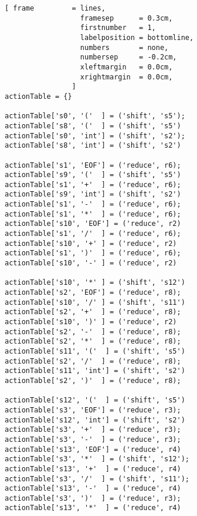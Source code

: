 \begin{figure}[!ht]
\centering
\begin{Verbatim}[ frame         = lines, 
                  framesep      = 0.3cm, 
                  firstnumber   = 1,
                  labelposition = bottomline,
                  numbers       = none,
                  numbersep     = -0.2cm,
                  xleftmargin   = 0.0cm,
                  xrightmargin  = 0.0cm,
                ]
actionTable = {}

actionTable['s0', '('  ] = ('shift', 's5');  actionTable['s8', '('  ] = ('shift', 's5')   
actionTable['s0', 'int'] = ('shift', 's2');  actionTable['s8', 'int'] = ('shift', 's2')   
                                                                                         
actionTable['s1', 'EOF'] = ('reduce', r6);   actionTable['s9', '('  ] = ('shift', 's5')   
actionTable['s1', '+'  ] = ('reduce', r6);   actionTable['s9', 'int'] = ('shift', 's2')   
actionTable['s1', '-'  ] = ('reduce', r6);                                                
actionTable['s1', '*'  ] = ('reduce', r6);   actionTable['s10', 'EOF'] = ('reduce', r2)   
actionTable['s1', '/'  ] = ('reduce', r6);   actionTable['s10', '+' ] = ('reduce', r2)    
actionTable['s1', ')'  ] = ('reduce', r6);   actionTable['s10', '-' ] = ('reduce', r2)    
                                             actionTable['s10', '*' ] = ('shift', 's12')
actionTable['s2', 'EOF'] = ('reduce', r8);   actionTable['s10', '/' ] = ('shift', 's11')  
actionTable['s2', '+'  ] = ('reduce', r8);   actionTable['s10', ')' ] = ('reduce', r2)    
actionTable['s2', '-'  ] = ('reduce', r8);                                                
actionTable['s2', '*'  ] = ('reduce', r8);   actionTable['s11', '('  ] = ('shift', 's5')  
actionTable['s2', '/'  ] = ('reduce', r8);   actionTable['s11', 'int'] = ('shift', 's2')  
actionTable['s2', ')'  ] = ('reduce', r8);                                                
                                             actionTable['s12', '('  ] = ('shift', 's5')  
actionTable['s3', 'EOF'] = ('reduce', r3);   actionTable['s12', 'int'] = ('shift', 's2')  
actionTable['s3', '+'  ] = ('reduce', r3);                                                
actionTable['s3', '-'  ] = ('reduce', r3);   actionTable['s13', 'EOF'] = ('reduce', r4)   
actionTable['s3', '*'  ] = ('shift', 's12'); actionTable['s13', '+'  ] = ('reduce', r4)   
actionTable['s3', '/'  ] = ('shift', 's11'); actionTable['s13', '-'  ] = ('reduce', r4)   
actionTable['s3', ')'  ] = ('reduce', r3);   actionTable['s13', '*'  ] = ('reduce', r4)   

\end{Verbatim}
\end{figure}
